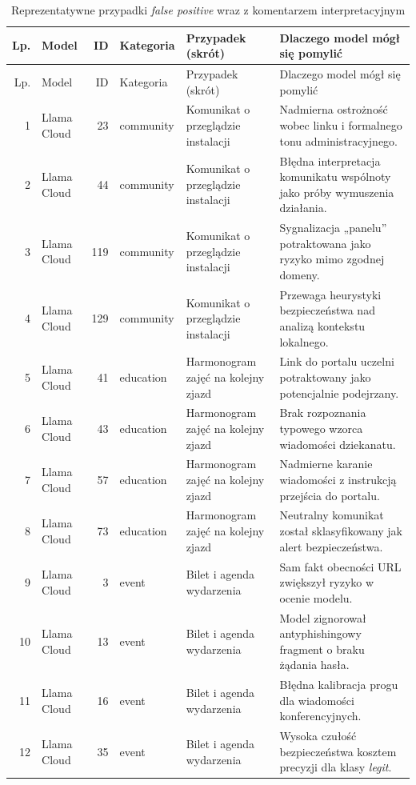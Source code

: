 \documentclass[12pt,a4paper,openany]{report}
\begin{document}
\begin{center}
\scriptsize
\begin{longtable}{r l r l p{3.2cm} p{4.8cm}}
\caption{Reprezentatywne przypadki \textit{false positive} wraz z komentarzem interpretacyjnym} \label{tab:fp-analysis} \\
\toprule
Lp. & Model & ID & Kategoria & Przypadek (skrót) & Dlaczego model mógł się pomylić \\
\midrule
\endfirsthead
\toprule
Lp. & Model & ID & Kategoria & Przypadek (skrót) & Dlaczego model mógł się pomylić \\
\midrule
\endhead
1 & Llama Cloud & 23 & community & Komunikat o przeglądzie instalacji & Nadmierna ostrożność wobec linku i formalnego tonu administracyjnego. \\
2 & Llama Cloud & 44 & community & Komunikat o przeglądzie instalacji & Błędna interpretacja komunikatu wspólnoty jako próby wymuszenia działania. \\
3 & Llama Cloud & 119 & community & Komunikat o przeglądzie instalacji & Sygnalizacja „panelu” potraktowana jako ryzyko mimo zgodnej domeny. \\
4 & Llama Cloud & 129 & community & Komunikat o przeglądzie instalacji & Przewaga heurystyki bezpieczeństwa nad analizą kontekstu lokalnego. \\
5 & Llama Cloud & 41 & education & Harmonogram zajęć na kolejny zjazd & Link do portalu uczelni potraktowany jako potencjalnie podejrzany. \\
6 & Llama Cloud & 43 & education & Harmonogram zajęć na kolejny zjazd & Brak rozpoznania typowego wzorca wiadomości dziekanatu. \\
7 & Llama Cloud & 57 & education & Harmonogram zajęć na kolejny zjazd & Nadmierne karanie wiadomości z instrukcją przejścia do portalu. \\
8 & Llama Cloud & 73 & education & Harmonogram zajęć na kolejny zjazd & Neutralny komunikat został sklasyfikowany jak alert bezpieczeństwa. \\
9 & Llama Cloud & 3 & event & Bilet i agenda wydarzenia & Sam fakt obecności URL zwiększył ryzyko w ocenie modelu. \\
10 & Llama Cloud & 13 & event & Bilet i agenda wydarzenia & Model zignorował antyphishingowy fragment o braku żądania hasła. \\
11 & Llama Cloud & 16 & event & Bilet i agenda wydarzenia & Błędna kalibracja progu dla wiadomości konferencyjnych. \\
12 & Llama Cloud & 35 & event & Bilet i agenda wydarzenia & Wysoka czułość bezpieczeństwa kosztem precyzji dla klasy \textit{legit}. \\

\end{longtable}
\end{center}
\end{document}
